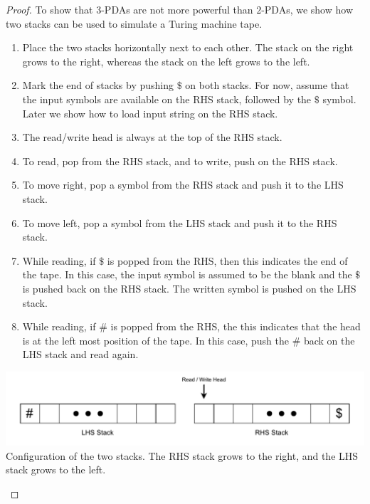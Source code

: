 \documentclass[11pt]{article}
\begin{document}
\begin{proof}
To show that $3$-PDAs are not more powerful than $2$-PDAs, we show how two stacks can be used to simulate a Turing machine tape.
\begin{enumerate}
\item Place the two stacks horizontally next to each other. The stack on the right grows to the right, whereas the stack on the left grows to the left.
\item Mark the end of stacks by pushing $\$$ on both stacks. For now, assume that the input symbols are available on the RHS stack, followed by the $\$$ symbol. Later we show how to load input string on the RHS stack.
\item The read/write head is always at the top of the RHS stack.
\item To read, pop from the RHS stack, and to write, push on the RHS stack.
\item To move right, pop a symbol from the RHS stack and push it to the LHS stack.
\item To move left, pop a symbol from the LHS stack and push it to the RHS stack.
\item While reading, if $\$$ is popped from the RHS, then this indicates the end of the tape. In this case, the input symbol is assumed to be the blank and the $\$$ is pushed back on the RHS stack. The written symbol is pushed on the LHS stack. 
\item While reading, if $\#$ is popped from the RHS, the this indicates that the head is at the left most position of the tape. In this case, push the $\#$ back on the LHS stack and read again.
\end{enumerate}
\begin{center}
\includegraphics[scale=1.0]{Figures/Problem3.9.pdf} \\
Configuration of the two stacks. The RHS stack grows to the right, and the LHS stack grows to the left.
\end{center}
\end{proof}
\end{document}
